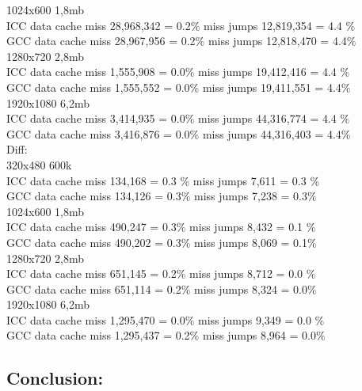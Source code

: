 1024x600 1,8mb \\
ICC    data cache miss  28,968,342 = 0.2$\%$ miss jumps   12,819,354 = 4.4 $\%$  \\
GCC   data cache miss 28,967,956 = 0.2$\%$ miss jumps   12,818,470 = 4.4$\%$  \\ 

1280x720 2,8mb \\
ICC    data cache miss 1,555,908 = 0.0$\%$ miss jumps  19,412,416 = 4.4 $\%$  \\
GCC   data cache miss 1,555,552 = 0.0$\%$ miss jumps   19,411,551 = 4.4$\%$  \\ 

1920x1080 6,2mb \\
ICC    data cache miss 3,414,935 = 0.0$\%$ miss jumps  44,316,774 = 4.4 $\%$  \\
GCC   data cache miss 3,416,876 = 0.0$\%$ miss jumps   44,316,403 = 4.4$\%$  \\ 

Diff: \\

320x480 600k \\
ICC    data cache miss  134,168 = 0.3 $\%$ miss jumps  7,611 = 0.3 $\%$  \\
GCC  data cache miss 134,126 = 0.3$\%$ miss jumps   7,238 = 0.3$\%$  \\ 

1024x600 1,8mb \\
ICC    data cache miss  490,247 = 0.3$\%$ miss jumps  8,432 = 0.1 $\%$  \\
GCC   data cache miss 490,202 = 0.3$\%$ miss jumps  8,069 = 0.1$\%$  \\ 

1280x720 2,8mb \\
ICC    data cache miss 651,145 = 0.2$\%$ miss jumps  8,712 = 0.0 $\%$  \\
GCC   data cache miss 651,114 = 0.2$\%$ miss jumps   8,324 = 0.0$\%$  \\ 

1920x1080 6,2mb \\
ICC    data cache miss  1,295,470 = 0.0$\%$ miss jumps  9,349 = 0.0 $\%$  \\
GCC   data cache miss 1,295,437 = 0.2$\%$ miss jumps   8,964 = 0.0$\%$  \\ 


\subsection{Conclusion:} \\

